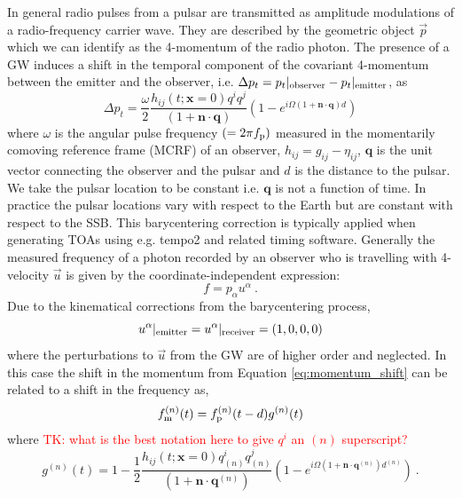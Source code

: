 \documentclass[fleqn,usenatbib,useAMS]{mnras}
\begin{document}
In general radio pulses from a pulsar are transmitted as amplitude modulations of a radio-frequency carrier wave. They are described by the geometric object $\vec{p}$ which we can identify  as the 4-momentum of the radio photon. The presence of a GW induces a shift in the temporal component of the covariant 4-momentum between the emitter and the observer, i.e. $\Delta p_t = p_t|_{\rm observer} - p_t|_{\rm emitter} $, as \citep[e.g.][]{Maggiore}
\begin{equation}
 \Delta p_t = \frac{\omega}{2} \frac{ h_{ij} (t; \boldsymbol{x}= 0)q^i q^j }{(1 + \boldsymbol{n}\cdot \boldsymbol{q}) }  \left(1 -e^{i \Omega (1 + \boldsymbol{n}\cdot \boldsymbol{q})  d}\right)
	\label{eq:momentum_shift}
\end{equation}
where $\omega$ is the angular pulse frequency $(= 2 \pi f_{\rm p})$ measured in the momentarily comoving reference frame (MCRF) of an observer, $h_{ij} = g_{ij} - \eta_{ij}$, $\boldsymbol{q}$ is the unit vector connecting the observer and the pulsar and $d$ is the distance to the pulsar. We take the pulsar location to be constant i.e.  $\boldsymbol{q}$ is not a function of time. In practice the pulsar locations vary with respect to the Earth but are constant with respect to the SSB. This barycentering correction is typically applied when generating TOAs using e.g. {\sc tempo2} and related timing software. Generally the measured frequency of a photon recorded by an observer who is travelling with 4-velocity $\vec{u}$ is given by the coordinate-independent expression:
\begin{equation}
	f = p_{\alpha} u^{\alpha} \ . 
	\label{eq:freq_temporal}
\end{equation}
Due to the kinematical corrections from the barycentering process, 
\begin{equation}
	u^{\alpha}|_{\rm emitter} = u^{\alpha}|_{\rm receiver} = (1,0,0,0)
\end{equation}
where the perturbations to $\vec{u}$ from the GW are of higher order and neglected. In this case the shift in the momentum from Equation \ref{eq:momentum_shift} can be related to a shift in the frequency as,
\begin{equation}
	f_{\rm m}^{(n)}(t) = f_{\rm p}^{(n)}(t-d) g^{(n)}(t)
	\label{eq:measurement}
\end{equation}
where \textcolor{red}{TK: what is the best notation here to give $q^i$ an $(n)$ superscript?}
\begin{equation}
	g^{(n)}(t) = 1 -  \frac{1}{2} \frac{h_{ij} (t; \boldsymbol{x}= 0)q^{i}_{(n)} q^{j}_{(n)} }{(1 + \boldsymbol{n}\cdot \boldsymbol{q}^{(n)}) }  \left(1 -e^{i \Omega \left(1 + \boldsymbol{n}\cdot \boldsymbol{q}^{(n)} \right)  d^{(n)}}\right) \ .
	\label{eq:g_func}
\end{equation}
\end{document}

